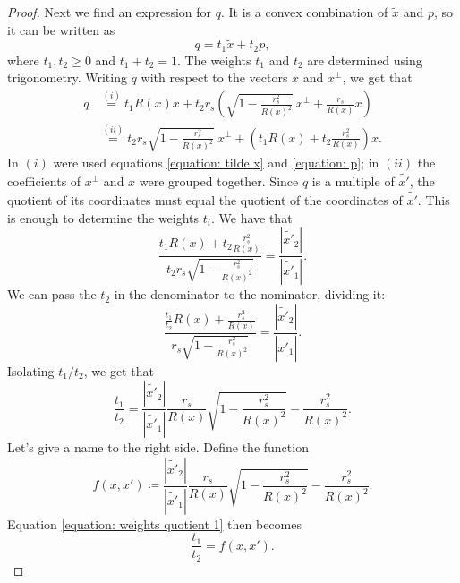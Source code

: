 \documentclass[10pt,a4paper]{amsart}
\begin{document}
\begin{proof}
	Next we find an expression for $q$. It is a convex combination of $\widetilde{x}$ and $p$, so it can be written as
	\begin{equation}
		q = t_1 \widetilde{x} + t_2 p,
	\end{equation}
	where $t_1, t_2 \geq 0$ and $t_1 + t_2 = 1$. The weights $t_1$ and $t_2$ are determined using trigonometry. Writing $q$ with respect to the vectors $x$ and $x^\perp$, we get that
	\begin{align*}
		q &\stackrel{(i)}{=} t_1 R(x) x  + t_2 r_s \left( \sqrt{1 - \frac{r_s^2}{R(x)^2}} \ x^\perp +  \frac{r_s}{R(x)} x \right) \\
		&\stackrel{(ii)}{=} t_2 r_s \sqrt{1 - \frac{r_s^2}{R(x)^2}} \ x^\perp + \left( t_1 R(x) + t_2 \frac{r_s^2}{R(x)} \right) x.
	\end{align*}
	In $(i)$ were used equations \ref{equation: tilde x} and \ref{equation: p}; in $(ii)$ the coefficients of $x^\perp$ and $x$ were grouped together. Since $q$ is a multiple of $\widetilde{x'}$, the quotient of its coordinates must equal the quotient of the coordinates of $\widetilde{x'}$. This is enough to determine the weights $t_i$. We have that
	\begin{equation}
		\frac{t_1 R(x) + t_2 \frac{r_s^2}{R(x)} }{ t_2 r_s \sqrt{1 - \frac{r_s^2}{R(x)^2}} } = \frac{|\widetilde{x'}_2|}{|\widetilde{x'}_1|}.
	\end{equation}
	We can pass the $t_2$ in the denominator to the nominator, dividing it:
	\begin{equation}
		\frac{\frac{t_1}{t_2} R(x) + \frac{r_s^2}{R(x)} }{ r_s \sqrt{1 - \frac{r_s^2}{R(x)^2}} } = \frac{|\widetilde{x'}_2|}{|\widetilde{x'}_1|}.
	\end{equation}
	Isolating $t_1 / t_2$, we get that
	\begin{equation}
		\label{equation: weights quotient 1}
		\frac{t_1}{t_2} = \frac{|\widetilde{x'}_2|}{|\widetilde{x'}_1|} \frac{r_s}{R(x)} \sqrt{1 - \frac{r_s^2}{R(x)^2}} -\frac{r_s^2}{R(x)^2}.
	\end{equation}
	Let's give a name to the right side. Define the function
	\begin{equation}
		\label{equation: f}
		f(x, x') \coloneqq \frac{|\widetilde{x'}_2|}{|\widetilde{x'}_1|} \frac{r_s}{R(x)} \sqrt{1 - \frac{r_s^2}{R(x)^2}} -\frac{r_s^2}{R(x)^2} .
	\end{equation}
	Equation \ref{equation: weights quotient 1} then becomes
	\begin{equation}
		\frac{t_1}{t_2} = f(x, x').
	\end{equation}

\end{proof}
\end{document}
